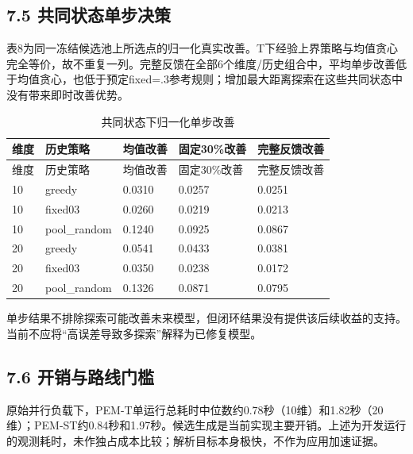 \documentclass[11pt,a4paper]{article}
\begin{document}
\hypertarget{ux5171ux540cux72b6ux6001ux5355ux6b65ux51b3ux7b56}{%
\subsection{7.5
共同状态单步决策}\label{ux5171ux540cux72b6ux6001ux5355ux6b65ux51b3ux7b56}}

表8为同一冻结候选池上所选点的归一化真实改善。T下经验上界策略与均值贪心完全等价，故不重复一列。完整反馈在全部6个维度/历史组合中，平均单步改善低于均值贪心，也低于预定fixed=.3参考规则；增加最大距离探索在这些共同状态中没有带来即时改善优势。

\par\noindent\begin{minipage}{\linewidth}

\begin{longtable}[]{@{}lllll@{}}
\caption{共同状态下归一化单步改善}\tabularnewline
\toprule
维度 & 历史策略 & 均值改善 & 固定30\%改善 & 完整反馈改善 \\
\midrule
\endfirsthead
\toprule
维度 & 历史策略 & 均值改善 & 固定30\%改善 & 完整反馈改善 \\
\midrule
\endhead
10 & greedy & 0.0310 & 0.0257 & 0.0251 \\
10 & fixed03 & 0.0260 & 0.0219 & 0.0213 \\
10 & pool\_random & 0.1240 & 0.0925 & 0.0867 \\
20 & greedy & 0.0541 & 0.0433 & 0.0381 \\
20 & fixed03 & 0.0350 & 0.0238 & 0.0172 \\
20 & pool\_random & 0.1326 & 0.0871 & 0.0795 \\
\bottomrule
\end{longtable}

\end{minipage}\par

单步结果不排除探索可能改善未来模型，但闭环结果没有提供该后续收益的支持。当前不应将``高误差导致多探索''解释为已修复模型。

\hypertarget{ux5f00ux9500ux4e0eux8defux7ebfux95e8ux69db}{%
\subsection{7.6
开销与路线门槛}\label{ux5f00ux9500ux4e0eux8defux7ebfux95e8ux69db}}

原始并行负载下，PEM-T单运行总耗时中位数约0.78秒（10维）和1.82秒（20维）；PEM-ST约0.84秒和1.97秒。候选生成是当前实现主要开销。上述为开发运行的观测耗时，未作独占成本比较；解析目标本身极快，不作为应用加速证据。
\end{document}
